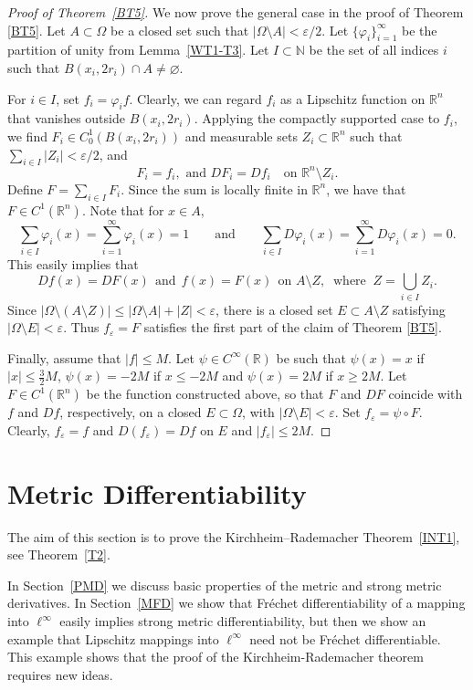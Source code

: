 \documentclass[12pt,leqno]{amsart}
\theoremstyle{definition}
\newcommand{\bbbn}{\mathbb N}
\newcommand{\bbbr}{\mathbb R}
\newcommand{\eps}{\varepsilon}
\numberwithin{theorem}{section} \numberwithin{equation}{section}
\begin{document}
\begin{proof}[Proof of Theorem~\ref{BT5}]
We now prove the general case in the proof of Theorem \ref{BT5}. Let $A\subset \Omega$ be a closed set such that
$|\Omega\setminus A|<\eps/2$.
Let $\{\varphi_i\}_{i=1}^{\infty}$ be the partition of unity from Lemma~\ref{WT1-T3}.
Let $I\subset\bbbn$ be the set of all indices $i$ such that $B(x_i,2r_i)\cap A\neq\varnothing$.

For $i\in I$, set $f_i=\varphi_i f$. Clearly, we can regard $f_i$ as a
Lipschitz function on $\mathbb R^n$ that vanishes outside $B(x_i,2r_i)$. Applying the compactly supported case to
$f_i$, we find $F_i\in C^1_0(B(x_i,2r_i))$ and measurable sets
$Z_i\subset \mathbb R^n$ such that
$\sum_{i\in I}|Z_i|<\eps/2$, and
\[
F_i=f_i, \text{ and } DF_i=Df_i
\quad\text{on } \mathbb R^n\setminus Z_i .
\]
Define $F=\sum_{i\in I}F_i$.
Since the sum is locally finite in $\mathbb R^n$, we have that $F\in C^1(\mathbb R^n)$.
Note that for $x\in A$,
$$
\sum_{i\in I}\varphi_i(x)= \sum_{i=1}^\infty\varphi_i(x)=1
\qquad
\text{and}
\qquad
\sum_{i\in I}D\varphi_i(x)= \sum_{i=1}^\infty D\varphi_i(x)=0.
$$
This easily implies that
$$
Df(x)=DF(x) \ \ \text{and}\ \ f(x)=F(x)
\ \
\text{on } A\setminus Z, \ \text{ where } \ Z=\bigcup_{i\in I} Z_i.
$$
Since $|\Omega\setminus(A\setminus Z)|\leq |\Omega\setminus A|+|Z|<\eps$, there is a closed set $E\subset A\setminus Z$ satisfying $|\Omega\setminus E|<\eps$. Thus $f_\eps=F$ satisfies the first part of the claim of Theorem \ref{BT5}.

Finally, assume that $|f|\leq M$. Let $\psi\in C^\infty(\bbbr)$ be such that $\psi(x)=x$ if $|x|\leq \tfrac{3}{2}M$, $\psi(x)=-2M$ if $x\leq -2M$ and $\psi(x)=2M$ if $x\geq 2M$. Let $F\in C^1(\bbbr^n)$ be the function constructed above, so that $F$ and $DF$ coincide with $f$ and $Df$, respectively, on a closed $E\subset \Omega$, with $|\Omega\setminus E|<\eps$. Set $f_\eps=\psi\circ F$. Clearly, $f_\eps=f$ and $D(f_\eps)=Df$ on $E$ and $|f_\eps|\leq 2M$.
\end{proof}

\section{Metric Differentiability}
\label{sec:metricdiff}
The aim of this section is to prove the Kirchheim–Rademacher Theorem~\ref{INT1}, see Theorem~\ref{T2}.

In Section~\ref{PMD} we discuss basic properties of the metric and strong metric derivatives.
In Section~\ref{MFD} we show that Fr\'echet differentiability of a mapping into $\ell^\infty$ easily implies strong metric differentiability, but then we  show an example that Lipschitz mappings into $\ell^\infty$ need not be Fr\'echet differentiable. This example shows that the proof of the Kirchheim-Rademacher theorem requires new ideas.
\end{document}
